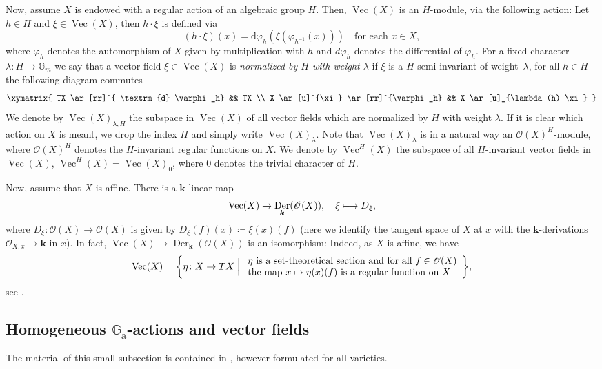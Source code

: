 \documentclass[JEP,XML,SOM,Unicode]{cedram}
\let\mathcal\mathscr
\def\mto{\mathchoice{\longmapsto}{\mapsto}{\mapsto}{\mapsto}}
\newcommand{\ra}{\mathrm{a}}
\theoremstyle{plain}
\theoremstyle{definition}
\DeclareMathOperator{\Ve}{Vec}
\DeclareMathOperator{\Der}{Der}
\newcommand{\OO}{\mathcal{O}}
\newcommand{\GG}{\mathbb{G}}
\newcommand{\kk}{{\boldsymbol{k}}}
\newcommand{\Bigset}[2]{\biggl\{#1 \Bigm|  #2\biggr\}}
\begin{document}
Now, assume $X$ is endowed with a regular action of an algebraic
group $H$. Then, $\Ve(X)$ is an $H$-module, via the following action: Let $h \in H$ and
$\xi \in \Ve(X)$, then $h \cdot \xi$ is defined via
\[
(h \cdot \xi) (x) = \mathrm{d} \varphi_h (\xi(\varphi_{h^{-1}}(x))) \quad \textrm{for each $x \in X$},
\]
where $\varphi_h$ denotes the automorphism of $X$ given by
multiplication with $h$ and $d\varphi_h$ denotes the differential of $\varphi_h$.
For a fixed character $\lambda \colon H \to \GG_m$ we say that a
vector field $\xi \in \Ve(X)$ is
\emph{normalized by $H$ with weight $\lambda$} if
$\xi$ is a $H$-semi-invariant of weight~$\lambda$,
\ie for all $h \in H$ the following diagram commutes
\[
\xymatrix{
TX \ar[rr]^{ \textrm{d} \varphi_h} && TX \\
X \ar[u]^{\xi} \ar[rr]^{\varphi_h} && X \ar[u]_{\lambda(h) \xi}
}
\]
We denote by $\Ve(X)_{\lambda, H}$
the subspace in $\Ve(X)$ of all vector fields which are normalized by $H$
with weight $\lambda$. If it is clear which action on $X$ is meant, we drop
the index $H$ and simply write $\Ve(X)_{\lambda}$. Note that $\Ve(X)_{\lambda}$
is in a natural way an $\OO(X)^H$-module, where $\OO(X)^H$
denotes the $H$-invariant regular functions on $X$.
We denote by $\Ve^H(X)$ the subspace of all
$H$-invariant vector fields in $\Ve(X)$, \ie $\Ve^H(X) = \Ve(X)_{0}$, where $0$
denotes the trivial character of $H$.

Now, assume that $X$ is affine. There is a $\kk$-linear map
\[
\Ve(X) \to \Der_{\kk}(\OO(X)), \quad \xi \mto D_{\xi},
\]
where $D_{\xi} \colon \OO(X) \to \OO(X)$ is given by $D_{\xi}(f)(x) \coloneqq \xi(x)(f)$
(here we identify the tangent space of $X$ at $x$ with the
$\kk$-derivations $\OO_{X, x}\to \kk$ in $x$). In fact, $\Ve(X) \to \Der_{\kk}(\OO(X))$ is an
isomorphism: Indeed, as $X$ is affine, we have
\[
\Ve(X) = \Bigset{ \eta \colon X \to TX }{
\begin{array}{l}
\textrm{$\eta$ is a set-theoretical section and for all $f \in \OO(X)$} \\
\textrm{the map $x \mto \eta(x)(f)$ is a regular function on $X$}
\end{array}
},
\]
see \cite[\S3.2]{FuKr2018On-the-geometry-of}.

\subsection{Homogeneous $\GG_\ra$-actions and vector fields}
\label{sec.GroupActionsAndVectorfields}

The material of this small subsection is contained in \cite[\S6.5]{FuKr2018On-the-geometry-of},
however formulated for all varieties.
\end{document}
